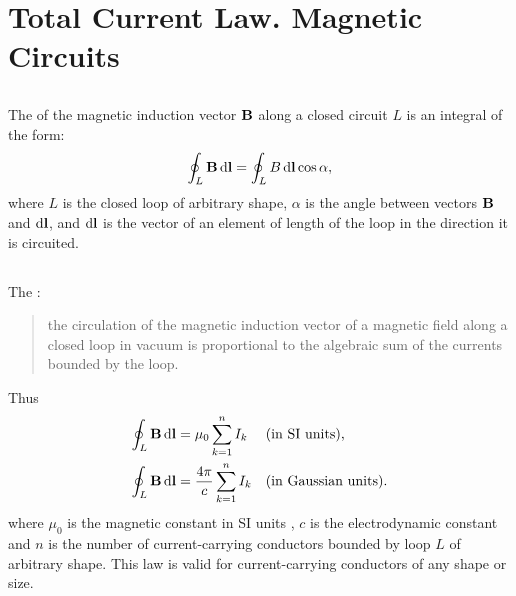\section{Total Current Law. Magnetic Circuits}
\label{sec-23.5}

\subsection{}\label{23.5.1} The  of the magnetic induction vector $\vb{B}$ along a closed circuit $L$ is an integral of the form:
\begin{equation*}%
\oint_{L} \vb{B}\, \dd \vb{l}  = \oint_{L} {B}\, \dd \vb{l} \cos \alpha,
\end{equation*}
where $L$ is the closed loop of arbitrary shape, $\alpha$ is the angle between vectors $\vb{B}$ and $\dd \vb{l}$, and $\dd \vb{l}$ is the vector of an element of length of the loop in the direction it is circuited.

\subsection{}\label{23.5.2} The : 
\begin{quote}
the circulation of the magnetic induction vector of a magnetic field along a closed loop in vacuum is proportional to the algebraic sum of the currents bounded by the loop. 
\end{quote}
Thus	
\begin{align*}%
\oint_{L} \vb{B}\, \dd \vb{l}  & = \mu_{0} \sum_{k =1}^{n}I_{k} &&  \text{(in SI units),} \\
\oint_{L} \vb{B}\, \dd \vb{l}  & =  \frac{4 \pi}{c} \sum_{k =1}^{n}I_{k} &&  \text{(in Gaussian units).}
\end{align*}
where $\mu_{0}$ is the magnetic constant in SI units , $c$ is the electrodynamic constant  and $n$ is the number of current-carrying conductors bounded by loop $L$ of arbitrary shape. This law is valid for current-carrying conductors of any shape or size.

